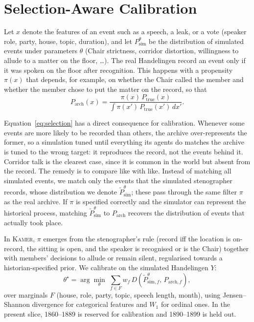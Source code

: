 \documentclass[sigconf,review,anonymous]{acmart}
\newcommand{\sys}{\textsc{Kamer}}
\begin{document}
\section{Selection-Aware Calibration}
\label{sec:calibration}

Let $x$ denote the features of an event such as a speech, a leak, or a
vote (speaker role, party, house, topic, duration), and let
$P^\theta_{\text{sim}}$ be the distribution of simulated events under
parameters $\theta$ (Chair strictness, corridor distortion, willingness to
allude to a matter on the floor, \ldots). The real Handelingen record an
event only if it was spoken on the floor after recognition. This happens
with a propensity $\pi(x)$ that depends, for example, on whether the Chair
called the member and whether the member chose to put the matter on the
record, so that
\begin{equation}
P_{\text{arch}}(x)=\frac{\pi(x)\,P_{\text{true}}(x)}{\int \pi(x')\,P_{\text{true}}(x')\,dx'}.
\label{eq:selection}
\end{equation}

Equation~\eqref{eq:selection} has a direct consequence for calibration.
Whenever some events are more likely to be recorded than others, the
archive over-represents the former, so a simulation tuned until everything
its agents do matches the archive is tuned to the wrong target: it
reproduces the record, not the events behind it. Corridor talk is the
clearest case, since it is common in the world but absent from the record.
The remedy is to compare like with like. Instead of matching all simulated
events, we match only the events that the simulated stenographer records,
whose distribution we denote $\tilde P^\theta_{\text{sim}}$; these pass
through the same filter $\pi$ as the real archive. If $\pi$ is specified
correctly and the simulator can represent the historical process, matching
$\tilde P^\theta_{\text{sim}}$ to $P_{\text{arch}}$ recovers the
distribution of events that actually took place.

In \sys{}, $\pi$ emerges from the stenographer's rule (record iff the
location is on-record, the sitting is open, and the speaker is recognised
or is the Chair) together with members' decisions to allude or remain
silent, regularised towards a historian-specified prior. We calibrate on
the simulated Handelingen $Y$:
\begin{equation}
\theta^\star=\arg\min_{\theta}\;\sum_{f\in F} w_f\,
D\!\left(\tilde P^{\theta}_{\text{sim},f},\,P_{\text{arch},f}\right),
\label{eq:calib}
\end{equation}
over marginals $F$ (house, role, party, topic, speech length, month),
using Jensen--Shannon divergence for categorical features and $W_1$ for
ordinal ones. In the present slice, 1860--1889 is reserved for calibration
and 1890--1899 is held out.
\end{document}
